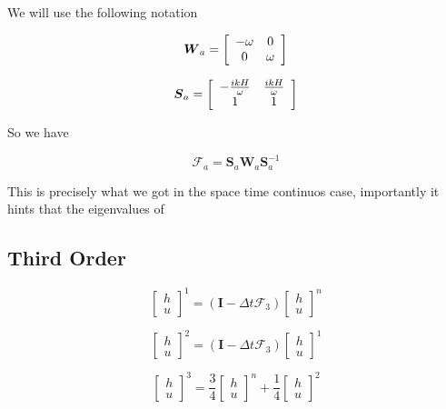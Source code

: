 \documentclass[12pt]{article}
\begin{document}
We will use the following notation

\[\boldsymbol{W}_a = \left[\begin{array}{c c}
- \omega & 0 \\ 0 &  \omega
\end{array}\right]\]

\[\boldsymbol{S}_a = \left[\begin{array}{c c}
- \frac{i kH}{\omega} & \frac{i kH}{\omega} \\ 1 &  1
\end{array}\right]\]

So we have 

\[\boldsymbol{\mathcal{F}}_a = \boldsymbol{S}_a \boldsymbol{W}_a \boldsymbol{S}^{-1}_a \]

This is precisely what we got in the space time continuos case, importantly it hints that the eigenvalues of 

\subsection{Third Order}
\[\left[\begin{array}{c}
h \\ u
\end{array}\right]^{1} = (\boldsymbol{I} - \Delta t\boldsymbol{\mathcal{F}}_3 )\left[\begin{array}{c}
h \\ u
\end{array}\right]^n\]

\[\left[\begin{array}{c}
h \\ u
\end{array}\right]^{2} = (\boldsymbol{I} - \Delta t\boldsymbol{\mathcal{F}}_3 )\left[\begin{array}{c}
h \\ u
\end{array}\right]^1\]

\[\left[\begin{array}{c}
h \\ u
\end{array}\right]^{3} = \frac{3}{4}\left[\begin{array}{c}
h \\ u
\end{array}\right]^n +  \frac{1}{4}\left[\begin{array}{c}
h \\ u
\end{array}\right]^2\]
\end{document}
